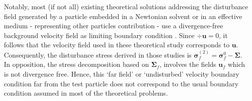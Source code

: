 Notably, most (if not all) existing theoretical solutions addressing the disturbance field generated by a particle embedded in a Newtonian solvent or in an effective medium - representing other particles contribution - use a divergence-free background velocity field as limiting boundary condition \citep{hinch1977averaged, kim1985modelling}. 
Since $\div \textbf{u} = 0$, it follows that the velocity field used in these theoretical study corresponds to $\textbf{u}$. 
Consequently, the disturbance stress derived in those studies is $\bm\sigma_f^{(2)} = \bm\sigma_f^0 - \bm\Sigma$.
In opposition, the stress decomposition based on $\bm\Sigma_f$, involves the fields $\textbf{u}_f$ which is not divergence free. 
Hence, this `far field' or `undisturbed' velocity boundary condition far from the test particle does not correspond to the usual boundary condition assumed in most of the theoretical problems. 
